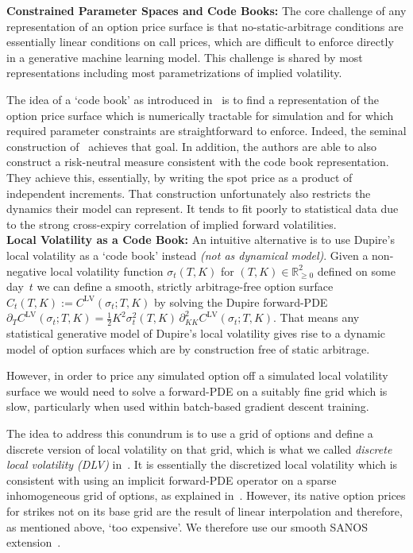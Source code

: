 \documentclass[11pt,a4paper]{article}
\newcommand{\R}{\mathbb{R}}
\begin{document}
\noindent
\textbf{Constrained Parameter Spaces and Code Books:}
The core challenge of any representation of an option price surface is that no-static-arbitrage conditions are essentially
linear conditions on call prices, which are difficult to enforce directly in a generative machine learning model.
This challenge is shared by most representations including most parametrizations of implied volatility.

The idea of a `code book' as introduced in~\citet{TangentLevy} is to find a representation of the option price surface
which is numerically tractable for simulation and for which required parameter constraints are straightforward to enforce.
Indeed, the seminal construction of~\citet{TangentLevy} achieves that goal. In addition, the authors are able to also
construct a risk-neutral measure consistent with the code book representation.
They achieve this, essentially, by writing the spot price as a product of independent increments. That construction unfortunately also restricts
the dynamics their model can represent. It tends to fit poorly to statistical data due to the strong cross-expiry correlation of implied forward volatilities.
\\

\noindent
\textbf{Local Volatility as a Code Book:}
An intuitive alternative is to use Dupire's local volatility as a `code book' instead
\emph{(not as dynamical model)}. Given a non-negative local volatility function
$\sigma_t(T,K)$ for $(T,K)\in\R^2_{\geq 0}$ defined on some day~$t$
we can define
a smooth, strictly arbitrage-free option surface
$C_t(T,K):=C^\mathrm{LV}(\sigma_t;T,K)$
by solving the Dupire forward-PDE
$\partial_T C^\mathrm{LV}(\sigma_t;T,K)
 = \mbox{$\frac12$}K^2\sigma_t^2(T,K)\,
   \partial^2_{KK}C^\mathrm{LV}(\sigma_t;T,K)$.
That means any statistical generative model of Dupire's local volatility gives rise
to a dynamic model of option surfaces which are by construction free of static arbitrage.

However, in order to price any simulated option off a simulated local volatility surface
we would need to solve a forward-PDE on a suitably
fine grid which is slow, particularly when used within batch-based gradient descent training.

The idea to address this conundrum is to use a grid of options and define a discrete version
of local volatility on that grid, which is what we called
\emph{discrete local volatility (DLV)} in~\citet{DLV}.
It is essentially the discretized local volatility which is consistent with using an implicit forward-PDE operator on a sparse inhomogeneous grid of options,
as explained in~\citet{AndreasenHuge}.
However,
its native option prices for strikes not on its base grid are the result of linear interpolation and therefore, as mentioned above, `too expensive'.
We therefore use
our smooth SANOS extension~\citep{SANOS2026}.
\end{document}
